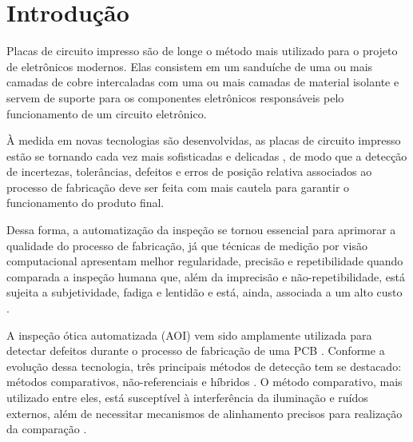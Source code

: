 \chapter{Introdução}
Placas de circuito impresso são de longe o método mais utilizado para o projeto de eletrônicos modernos. Elas consistem em um sanduíche de uma ou mais camadas de cobre intercaladas com uma ou mais camadas de material isolante \cite{ref:Zumbahlen} e servem de suporte para os componentes eletrônicos responsáveis pelo funcionamento de um circuito eletrônico.

À medida em novas tecnologias são desenvolvidas, as placas de circuito impresso estão se tornando cada vez mais sofisticadas e delicadas \cite{ref:Hu-Wang}, de modo que a detecção de incertezas, tolerâncias, defeitos e erros de posição relativa associados ao processo de fabricação \cite{ref:Leta-Feliciano-Martins} deve ser feita com mais cautela para garantir o funcionamento do produto final.

Dessa forma, a automatização da inspeção se tornou essencial para aprimorar a qualidade do processo de fabricação, já que técnicas de medição por visão computacional apresentam melhor regularidade, precisão e repetibilidade quando comparada a inspeção humana que, além da imprecisão e não-repetibilidade, está sujeita a subjetividade, fadiga e lentidão e está, ainda, associada a um alto custo \cite{ref:Leta-Feliciano-Martins}.

A inspeção ótica automatizada (AOI) vem sido amplamente utilizada para detectar defeitos durante o processo de fabricação de uma PCB \cite{ref:Chin-Harlow}. Conforme a evolução dessa tecnologia, três principais métodos de detecção tem se destacado: métodos comparativos, não-referenciais e híbridos \cite{ref:Wu-Wang-Liu}. O método comparativo, mais utilizado entre eles, está susceptível à interferência da iluminação e ruídos externos, além de necessitar mecanismos de alinhamento precisos para realização da comparação \cite{ref:Hu-Wang}.




